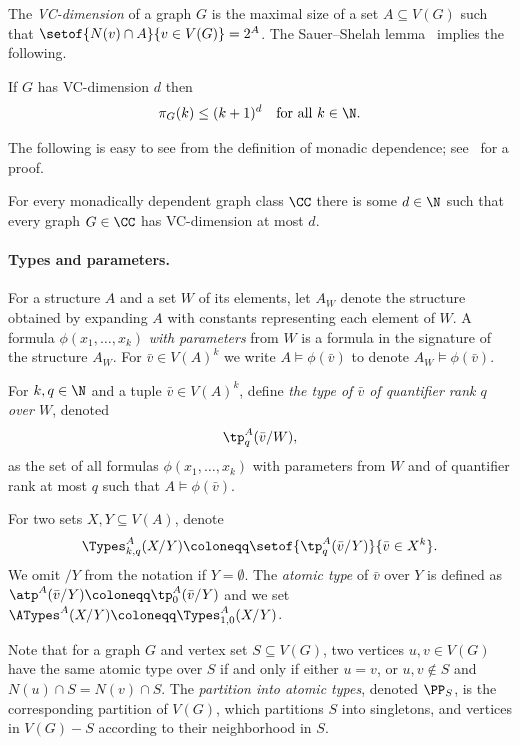 The \emph{VC-dimension} of a graph $G$ is the maximal size of a set $A\subseteq V(G)$ such that $\setof{N(v)\cap A}{v\in V(G)}=2^A$. The Sauer--Shelah lemma~\cite{Sauer72,She72} implies the following.
\begin{lemma}\label{lem:ss}
  If $G$ has VC-dimension $d$ then
  $$\pi_G(k)\le (k+1)^d\quad\text{for all }k\in\N.$$
\end{lemma}
The following is easy to see from the definition of monadic dependence; see~\cite[Observation~3.2]{md-abmw} for a proof.
\begin{observation}\label{obs:md-vc}
For every monadically dependent graph class $\CC$ there is some $d\in\N$
such that every graph $G\in\CC$ has VC-dimension at most $d$.
\end{observation}

\paragraph{Types and parameters.}
For a structure $A$ and a set $W$ of its elements,
let $A_W$ denote the structure obtained by expanding $A$  with constants representing each element of $W$.
A formula $\phi(x_1,\ldots,x_k)$ \emph{with parameters} from $W$ is a formula in the signature of the structure $A_W$.
For $\bar v\in V(A)^k$ we write $A\models\phi(\bar v)$ to denote $A_W\models\phi(\bar v)$.

For $k,q\in\N$
and a tuple $\bar v\in V(A)^k$,
define
\emph{the type of $\bar v$ of quantifier rank $q$ over $W$}, denoted
$$\tp^A_q(\bar v/W),$$ as the set of all formulas $\phi(x_1,\ldots,x_k)$ with parameters from $W$ and of quantifier rank at most $q$ such that
$A\models \phi(\bar v)$.

For two sets $X,Y\subseteq V(A)$,
denote $$\Types^A_{k,q}(X/Y)\coloneqq \setof{\tp^A_q(\bar v/Y)}{\bar v\in X^k}.$$
We omit $/Y$ from the notation if $Y=\emptyset$.
The \emph{atomic type} of $\bar v$ over $Y$ is defined as $\atp^A(\bar v/Y) \coloneqq \tp_0^A(\bar v/Y)$ and we set $\ATypes^A(X/Y)\coloneqq \Types^A_{1,0}(X/Y)$.

Note that for a graph $G$ and vertex set $S\subseteq V(G)$, two vertices $u,v\in V(G)$ have the same atomic type over $S$ if and only if either $u=v$, or $u,v\notin S$
and $N(u)\cap S=N(v)\cap S$.
The \emph{partition into atomic types}, denoted $\PP_S$, is the corresponding partition of
$V(G)$, which partitions $S$ into singletons, and vertices in $V(G)-S$ according to their neighborhood in $S$.

